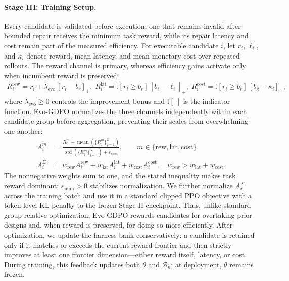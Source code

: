\documentclass{article}
\begin{document}
\paragraph{Stage III: Training Setup.}
Every candidate is validated before execution; one that remains invalid after bounded repair receives the minimum task reward, while its repair latency and cost remain part of the measured efficiency. For executable candidate $i$, let $r_i$, $\bar\ell_i$, and $\bar\kappa_i$ denote reward, mean latency, and mean monetary cost over repeated rollouts. The reward channel is primary, whereas efficiency gains activate only when incumbent reward is preserved:
\begin{equation}
\label{eq:stage3_reward_channel}
\begin{aligned}
R^{\mathrm{rew}}_i = r_i + \lambda_{\mathrm{evo}}\,[r_i - b_r]_{+},\;
R^{\mathrm{lat}}_i = \mathbb{I}[r_i \ge b_r]\,[b_{\ell} - \bar{\ell}_i]_{+},\;
R^{\mathrm{cost}}_i = \mathbb{I}[r_i \ge b_r]\,[b_{\kappa} - \bar{\kappa}_i]_{+},
\end{aligned}
\end{equation}
where $\lambda_{\mathrm{evo}}\geq0$ controls the improvement bonus and $\mathbb{I}[\cdot]$ is the indicator function. Evo-GDPO normalizes the three channels independently within each candidate group before aggregation, preventing their scales from overwhelming one another:
\begin{equation}
\label{eq:stage3_decoupled_adv}
\begin{aligned}
A^{m}_{i}
&= \frac{R^{m}_{i} - \operatorname{mean}(\{R^{m}_{j}\}_{j=1}^{G})}
{\operatorname{std}(\{R^{m}_{j}\}_{j=1}^{G}) + \varepsilon_{\mathrm{num}}},
\qquad m\in\{\mathrm{rew},\mathrm{lat},\mathrm{cost}\}, \\
A^{\Sigma}_{i}
&= w_{\mathrm{rew}} A^{\mathrm{rew}}_{i}
+ w_{\mathrm{lat}} A^{\mathrm{lat}}_{i}
+ w_{\mathrm{cost}} A^{\mathrm{cost}}_{i},
\quad w_{\mathrm{rew}}>w_{\mathrm{lat}}+w_{\mathrm{cost}}.
\end{aligned}
\end{equation}
The nonnegative weights sum to one, and the stated inequality makes task reward dominant; $\varepsilon_{\mathrm{num}}>0$ stabilizes normalization. We further normalize $A_i^{\Sigma}$ across the training batch and use it in a standard clipped PPO objective with a token-level KL penalty to the frozen Stage-II checkpoint. Thus, unlike standard group-relative optimization, Evo-GDPO rewards candidates for overtaking prior designs and, when reward is preserved, for doing so more efficiently. After optimization, we update the harness bank conservatively: a candidate is retained only if it matches or exceeds the current reward frontier and then strictly improves at least one frontier dimension---either reward itself, latency, or cost. During training, this feedback updates both $\theta$ and $\mathcal{B}_n$; at deployment, $\theta$ remains frozen.
\end{document}
